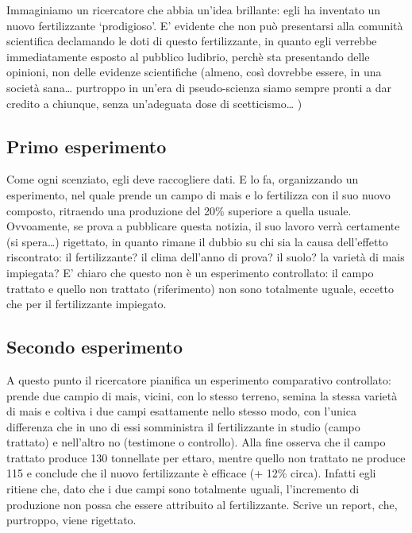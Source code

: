 \documentclass[a4paper,12pt,oneside]{book}
\begin{document}
Immaginiamo un ricercatore che abbia un'idea brillante: egli ha
inventato un nuovo fertilizzante `prodigioso'. E' evidente che non può
presentarsi alla comunità scientifica declamando le doti di questo
fertilizzante, in quanto egli verrebbe immediatamente esposto al
pubblico ludibrio, perchè sta presentando delle opinioni, non delle
evidenze scientifiche (almeno, così dovrebbe essere, in una società
sana\ldots{} purtroppo in un'era di pseudo-scienza siamo sempre pronti a
dar credito a chiunque, senza un'adeguata dose di scetticismo\ldots{} )

\subsection{Primo esperimento}\label{primo-esperimento}

Come ogni scenziato, egli deve raccogliere dati. E lo fa, organizzando
un esperimento, nel quale prende un campo di mais e lo fertilizza con il
suo nuovo composto, ritraendo una produzione del 20\% superiore a quella
usuale. Ovvoamente, se prova a pubblicare questa notizia, il suo lavoro
verrà certamente (si spera\ldots{}) rigettato, in quanto rimane il
dubbio su chi sia la causa dell'effetto riscontrato: il fertilizzante?
il clima dell'anno di prova? il suolo? la varietà di mais impiegata? E'
chiaro che questo non è un esperimento controllato: il campo trattato e
quello non trattato (riferimento) non sono totalmente uguale, eccetto
che per il fertilizzante impiegato.

\subsection{Secondo esperimento}\label{secondo-esperimento}

A questo punto il ricercatore pianifica un esperimento comparativo
controllato: prende due campio di mais, vicini, con lo stesso terreno,
semina la stessa varietà di mais e coltiva i due campi esattamente nello
stesso modo, con l'unica differenza che in uno di essi somministra il
fertilizzante in studio (campo trattato) e nell'altro no (testimone o
controllo). Alla fine osserva che il campo trattato produce 130
tonnellate per ettaro, mentre quello non trattato ne produce 115 e
conclude che il nuovo fertilizzante è efficace (+ 12\% circa). Infatti
egli ritiene che, dato che i due campi sono totalmente uguali,
l'incremento di produzione non possa che essere attribuito al
fertilizzante. Scrive un report, che, purtroppo, viene rigettato.
\end{document}
